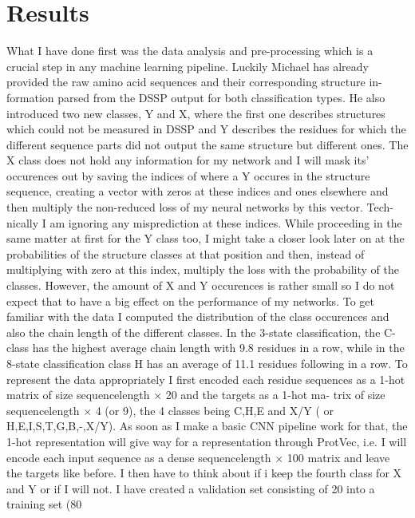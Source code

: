 \documentclass{article}
\begin{document}
\section{Results}
What I have done first was the data analysis and pre-processing which is
a crucial step in any machine learning pipeline. Luckily Michael has already
provided the raw amino acid sequences and their corresponding structure in-
formation parsed from the DSSP output for both classification types. He also
introduced two new classes, Y and X, where the first one describes structures
which could not be measured in DSSP and Y describes the residues for which the
different sequence parts did not output the same structure but different ones.
The X class does not hold any information for my network and I will mask
its’ occurences out by saving the indices of where a Y occures in the structure
sequence, creating a vector with zeros at these indices and ones elsewhere and
then multiply the non-reduced loss of my neural networks by this vector. Tech-
nically I am ignoring any misprediction at these indices. While proceeding in
the same matter at first for the Y class too, I might take a closer look later on
at the probabilities of the structure classes at that position and then, instead
of multiplying with zero at this index, multiply the loss with the probability of
the classes. However, the amount of X and Y occurences is rather small so I do
not expect that to have a big effect on the performance of my networks. To get
familiar with the data I computed the distribution of the class occurences and
also the chain length of the different classes. In the 3-state classification, the
C-class has the highest average chain length with 9.8 residues in a row, while in
the 8-state classification class H has an average of 11.1 residues following in a
row. To represent the data appropriately I first encoded each residue sequences
as a 1-hot matrix of size sequencelength $\times$ 20 and the targets as a 1-hot ma-
trix of size sequencelength $\times$ 4 (or 9), the 4 classes being C,H,E and X/Y ( or H,E,I,S,T,G,B,-,X/Y). As soon as I make a basic CNN pipeline work for that,
the 1-hot representation will give way for a representation through ProtVec, i.e.
I will encode each input sequence as a dense sequencelength $\times$ 100 matrix and
leave the targets like before. I then have to think about if i keep the fourth
class for X and Y or if I will not. I have created a validation set consisting of
20%
into a training set (80%
\end{document}
